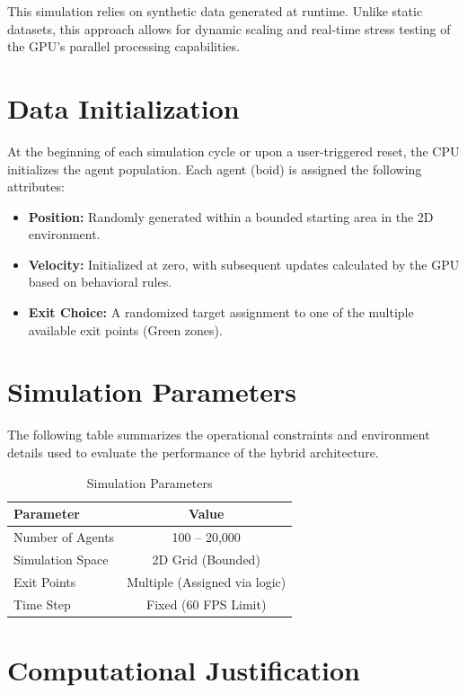\documentclass[12pt,a4paper]{report}
\begin{document}
This simulation relies on synthetic data generated at runtime. Unlike static datasets, this approach allows for dynamic scaling and real-time stress testing of the GPU’s parallel processing capabilities.

\section{Data Initialization}

At the beginning of each simulation cycle or upon a user-triggered reset, the CPU initializes the agent population. Each agent (boid) is assigned the following attributes:

\begin{itemize}
    \item \textbf{Position:} Randomly generated within a bounded starting area in the 2D environment.
    
    \item \textbf{Velocity:} Initialized at zero, with subsequent updates calculated by the GPU based on behavioral rules.
    
    \item \textbf{Exit Choice:} A randomized target assignment to one of the multiple available exit points (Green zones).
\end{itemize}

\section{Simulation Parameters}

The following table summarizes the operational constraints and environment details used to evaluate the performance of the hybrid architecture.

\begin{table}[h]
\centering
\begin{tabular}{|l|c|}
\hline
\textbf{Parameter} & \textbf{Value} \\
\hline
Number of Agents & 100 -- 20,000 \\
Simulation Space & 2D Grid (Bounded) \\
Exit Points & Multiple (Assigned via logic) \\
Time Step & Fixed (60 FPS Limit) \\
\hline
\end{tabular}
\caption{Simulation Parameters}
\end{table}

\section{Computational Justification}
\end{document}
